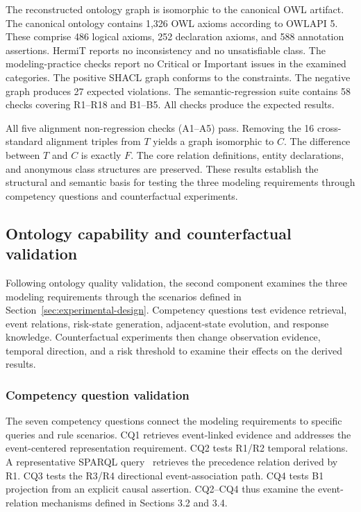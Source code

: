 \documentclass[Royal,sageh,times]{sagej}
\begin{document}
The reconstructed ontology graph is isomorphic to the canonical OWL artifact. The canonical ontology contains 1,326 OWL axioms according to OWLAPI 5. These comprise 486 logical axioms, 252 declaration axioms, and 588 annotation assertions. HermiT reports no inconsistency and no unsatisfiable class. The modeling-practice checks report no Critical or Important issues in the examined categories. The positive SHACL graph conforms to the constraints. The negative graph produces 27 expected violations. The semantic-regression suite contains 58 checks covering R1--R18 and B1--B5. All checks produce the expected results.

All five alignment non-regression checks (A1--A5) pass. Removing the 16 cross-standard alignment triples from $T$ yields a graph isomorphic to $C$. The difference between $T$ and $C$ is exactly $F$. The core relation definitions, entity declarations, and anonymous class structures are preserved. These results establish the structural and semantic basis for testing the three modeling requirements through competency questions and counterfactual experiments.

\subsection{Ontology capability and counterfactual validation}
\label{sec:capability-verification}

Following ontology quality validation, the second component examines the three modeling requirements through the scenarios defined in Section~\ref{sec:experimental-design}. Competency questions test evidence retrieval, event relations, risk-state generation, adjacent-state evolution, and response knowledge. Counterfactual experiments then change observation evidence, temporal direction, and a risk threshold to examine their effects on the derived results.

\subsubsection{Competency question validation}

The seven competency questions connect the modeling requirements to specific queries and rule scenarios. CQ1 retrieves event-linked evidence and addresses the event-centered representation requirement. CQ2 tests R1/R2 temporal relations. A representative SPARQL query~\citep{sparql2013} retrieves the precedence relation derived by R1. CQ3 tests the R3/R4 directional event-association path. CQ4 tests B1 projection from an explicit causal assertion. CQ2--CQ4 thus examine the event-relation mechanisms defined in Sections 3.2 and 3.4.
\end{document}
